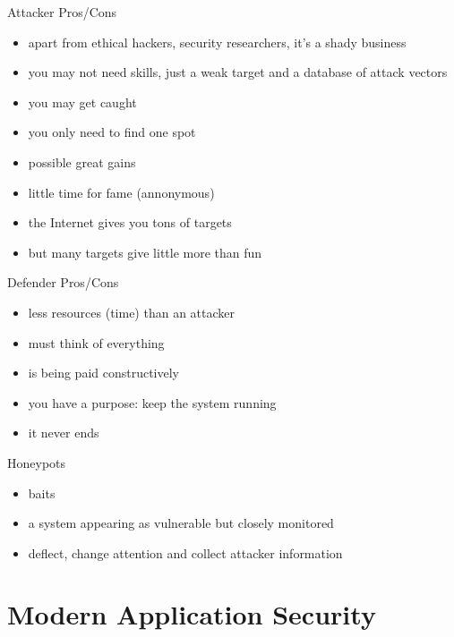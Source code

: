\documentclass{curs}
\begin{document}
\begin{frame}{Attacker Pros/Cons}
  \begin{itemize}
    \pause \item apart from ethical hackers, security researchers, it's a shady business
    \pause \item you may not need skills, just a weak target and a database of attack vectors
    \pause \item you may get caught
    \pause \item you only need to find one spot
    \pause \item possible great gains
    \pause \item little time for fame (annonymous)
    \pause \item the Internet gives you tons of targets
    \pause \item but many targets give little more than fun
  \end{itemize}
\end{frame}

\begin{frame}{Defender Pros/Cons}
  \begin{itemize}
    \pause \item less resources (time) than an attacker
    \pause \item must think of everything
    \pause \item is being paid constructively
    \pause \item you have a purpose: keep the system running
    \pause \item it never ends
  \end{itemize}
\end{frame}

\begin{frame}{Honeypots}
  \begin{itemize}
    \pause \item baits
    \pause \item a system appearing as vulnerable but closely monitored
    \pause \item deflect, change attention and collect attacker information
  \end{itemize}
\end{frame}

\section{Modern Application Security}
\end{document}
